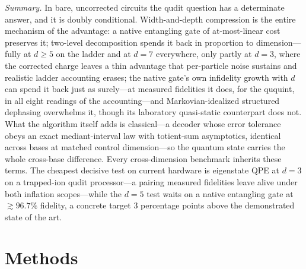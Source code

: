 \documentclass[aps,pra,reprint,superscriptaddress,nofootinbib,floatfix]{revtex4-2}
\begin{document}
\emph{Summary.} In bare, uncorrected circuits the qudit question has
a determinate answer, and it is doubly conditional. Width-and-depth
compression is the entire mechanism of the advantage: a native
entangling gate of at-most-linear cost preserves it; two-level
decomposition spends it back in proportion to dimension---fully at
$d\ge5$ on the ladder and at $d=7$ everywhere, only partly at
$d=3$, where the corrected charge leaves a thin advantage that
per-particle noise sustains and realistic ladder accounting
erases; the native gate's own infidelity growth
with $d$ can spend it back just as surely---at measured fidelities it
does, for the ququint, in all eight readings of the accounting---and
Markovian-idealized structured
dephasing overwhelms it, though its laboratory quasi-static
counterpart does not. What the algorithm itself adds is classical---a
decoder whose error tolerance obeys an exact mediant-interval law
with totient-sum asymptotics, identical
across bases at matched control dimension---so the quantum state
carries the whole cross-base difference. Every cross-dimension
benchmark inherits these terms. The cheapest decisive test on current
hardware is eigenstate QPE at $d=3$ on a trapped-ion qudit
processor---a pairing measured fidelities leave alive under
both inflation scopes---while
the $d=5$ test waits on a native entangling gate at
${\gtrsim}96.7\%$ fidelity, a concrete target $3$ percentage points
above the demonstrated state of the art.

\section{Methods}
\label{sec:methods}
\end{document}
